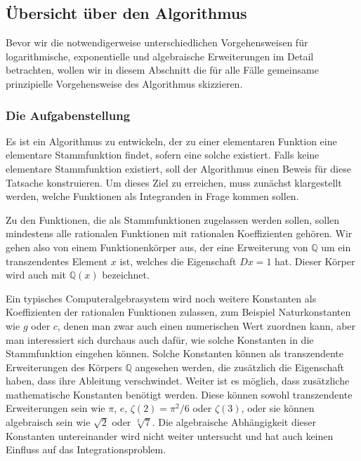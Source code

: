 %
%
\subsection{Übersicht über den Algorithmus
\label{buch:intalg:risch:uebersicht}}
Bevor wir die notwendigerweise unterschiedlichen Vorgehensweisen 
für logarithmische, exponentielle und algebraische Erweiterungen
im Detail betrachten, wollen wir in diesem Abschnitt die für alle
Fälle gemeinsame prinzipielle Vorgehensweise
des Algorithmus skizzieren.

%
%
\subsubsection{Die Aufgabenstellung}
Es ist ein Algorithmus zu entwickeln, der zu einer elementaren Funktion
eine elementare Stammfunktion findet, sofern eine solche existiert.
Falls keine elementare Stammfunktion existiert, soll der Algorithmus
einen Beweis für diese Tatsache konstruieren.
Um dieses Ziel zu erreichen, muss zunächst klargestellt werden, welche
Funktionen als Integranden in Frage kommen sollen.

Zu den Funktionen, die als Stammfunktionen zugelassen werden sollen,
sollen mindestens alle rationalen Funktionen mit rationalen Koeffizienten
gehören.
Wir gehen also von einem Funktionenkörper aus, der eine Erweiterung
von $\mathbb{Q}$ um ein transzendentes Element $x$ ist, welches die
Eigenschaft $Dx=1$ hat.
Dieser Körper wird auch mit $\mathbb{Q}(x)$ bezeichnet.

Ein typisches Computeralgebrasystem wird noch weitere Konstanten
als Koeffizienten der rationalen Funktionen zulassen, zum Beispiel
Naturkonstanten wie $g$ oder $c$, denen man zwar auch einen numerischen
Wert zuordnen kann, aber man interessiert sich durchaus auch dafür, 
wie solche Konstanten in die Stammfunktion eingehen können.
Solche Konstanten können als transzendente Erweiterungen des Körpers
$\mathbb{Q}$ angesehen werden, die zusätzlich die Eigenschaft haben,
dass ihre Ableitung verschwindet.
Weiter ist es möglich, dass zusätzliche mathematische Konstanten
benötigt werden.
Diese können sowohl transzendente Erweiterungen sein wie $\pi$, $e$,
$\zeta(2)=\pi^2/6$ oder $\zeta(3)$, oder sie können algebraisch sein wie
$\!\sqrt{2}$ oder $\sqrt[3]{7}$.
Die algebraische Abhängigkeit dieser Konstanten untereinander wird
nicht weiter untersucht und hat auch keinen Einfluss auf das
Integrationsproblem.

